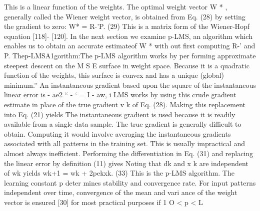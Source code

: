 \documentclass[11pt,a4paper,twocolumn]{article}
\begin{document}
{This is a linear function of the weights. The optimal weight 
vector W * ,  generally called the Wiener weight vector, is 
obtained from Eq. (28) by setting the gradient to zero: 
W* = R-’P. 
(29) 
This is a matrix form of the Wiener-Hopf equation [118]- 
[120]. In the next section we examine p-LMS, an algorithm 
which enables us to obtain an accurate estimateof W *  with
out first computing R-’ and P. 
Thep-LMSA1gorithm:The p-LMS algorithm works by per
forming approximate steepest descent on the M S E  surface 
in weight space. Because it is a quadratic function of the 
weights, this surface is convex and has a unique (global) 
minimum.” An instantaneous gradient based upon the 
square of the instantaneous linear error is 
- 
ae2 
“ - ‘ = I  
- aw, 
i 
LMS works by using this crude gradient estimate in place 
of the true gradient v k  of Eq. (28). Making this replacement 
into Eq. (21) yields 
The instantaneous gradient is used because it is readily 
available from a single data sample. The true gradient is 
generally difficult to obtain. Computing it would involve 
averaging the instantaneous gradients associated with all 
patterns in the training set. This is usually impractical and 
almost always inefficient. 
Performing the differentiation in Eq. (31) and replacing 
the linear error by definition (11) gives 
Noting that dk and x k  are independent of wk yields 
wk+1 = wk + 2pekxk. 
(33) 
This is the p-LMS algorithm. The learning constant p deter
mines stability and convergence rate. For input patterns 
independent over time, convergence of the mean and vari
ance of the weight vector is ensured [30] for most practical 
purposes if 
1 
O
<
p
<
L

}
\end{document}
